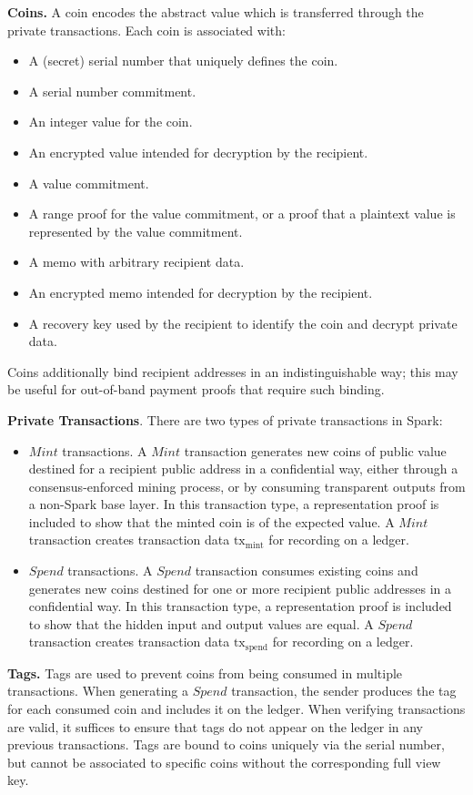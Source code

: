 \documentclass{llncs}
\begin{document}
\textbf{Coins.} A coin encodes the abstract value which is transferred through the private transactions. Each coin is associated with:
\begin{itemize}
\item A (secret) serial number that uniquely defines the coin.
\item A serial number commitment.
\item An integer value for the coin.
\item An encrypted value intended for decryption by the recipient.
\item A value commitment.
\item A range proof for the value commitment, or a proof that a plaintext value is represented by the value commitment.
\item A memo with arbitrary recipient data.
\item An encrypted memo intended for decryption by the recipient.
\item A recovery key used by the recipient to identify the coin and decrypt private data.
\end{itemize}
Coins additionally bind recipient addresses in an indistinguishable way; this may be useful for out-of-band payment proofs that require such binding.

\textbf{Private Transactions}. There are two types of private transactions in Spark:
\begin{itemize}
    \item $Mint$ transactions.
    A $Mint$ transaction generates new coins of public value destined for a recipient public address in a confidential way, either through a consensus-enforced mining process, or by consuming transparent outputs from a non-Spark base layer.
    In this transaction type, a representation proof is included to show that the minted coin is of the expected value.
    A $Mint$ transaction creates transaction data $\text{tx}_{\text{mint}}$ for recording on a ledger.
    \item $Spend$ transactions.
    A $Spend$ transaction consumes existing coins and generates new coins destined for one or more recipient public addresses in a confidential way.
    In this transaction type, a representation proof is included to show that the hidden input and output values are equal.
    A $Spend$ transaction creates transaction data $\text{tx}_{\text{spend}}$ for recording on a ledger.
\end{itemize}

\textbf{Tags.} Tags are used to prevent coins from being consumed in multiple transactions.
When generating a $Spend$ transaction, the sender produces the tag for each consumed coin and includes it on the ledger.
When verifying transactions are valid, it suffices to ensure that tags do not appear on the ledger in any previous transactions.
Tags are bound to coins uniquely via the serial number, but cannot be associated to specific coins without the corresponding full view key.
\end{document}
